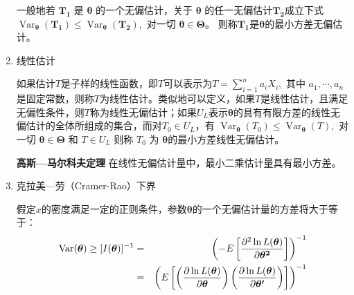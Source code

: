 \begin{enumerate}[1)]
		一般地若 $ \boldsymbol{T_1} $ 是 $ \boldsymbol{\theta} $ 的一个无偏估计，关于 $ \boldsymbol{\theta} $ 的任一无偏估计$ \boldsymbol{T_2} $成立下式
        $ \operatorname{Var}_{\boldsymbol{\theta}}\left(\boldsymbol{T_{1}}\right) \leqslant 
           \operatorname{Var}_{\boldsymbol{\theta}}\left(\boldsymbol{T_{2}}\right),$  对一切  $\boldsymbol{\theta \in \Theta }$。
		则称$\boldsymbol{ T_1 } $是$ \boldsymbol{\theta} $的最小方差无偏估计。
		
		\item 线性估计
		
		如果估计$ T $是子样的线性函数，即$ T $可以表示为$ T=\sum_{i=1}^{n} a_{i} X_{i},  $ 其中  $ a_{1}, \cdots, a_{n} $是固定常数，则称$ T $为线性估计。类似地可以定义，如果$ T $是线性估计，且满足无偏性条件，则$ T $称为线性无偏估计；如果$ U_L $表示$ \boldsymbol{\theta} $的具有有限方差的线性无偏估计的全体所组成的集合，而对$ T_0 \in U_L$，有
        $ \operatorname{Var}_{\boldsymbol{\theta}}\left(T_{0}\right) \leqslant \operatorname{Var}_{\boldsymbol{\theta}}(T),$  
        对一切  $ \boldsymbol{\theta \in \Theta}$ 和  $T \in U_{L} $ 
		则称 $ T_0 $ 为 $ \boldsymbol{\theta} $的最小方差线性无偏估计。
		
		{\bf 高斯—马尔科夫定理} 在线性无偏估计量中，最小二乘估计量具有最小方差。
		
		\item 克拉美—劳（Cramer-Rao）下界
		\begin{mydef}
			假定$ x $的密度满足一定的正则条件，参数$ \boldsymbol{\theta} $的一个无偏估计量的方差将大于等于：
		\begin{eqnarray}
            \operatorname{Var}(\boldsymbol{\theta}) \geq[I(\boldsymbol{\theta})]^{-1}  & = & \left(-E\left[\frac{\partial^{2} 
            \ln L(\boldsymbol{\theta} )}{\partial \boldsymbol{\theta^{2}} }\right]\right)^{-1} \notag \\
            & = & \left(E\left[\left(\frac{\partial \ln L(\boldsymbol{\theta})}{\partial \boldsymbol{\theta}}\right)
            \left(\frac{\partial \ln L(\boldsymbol{\theta})}{\partial \boldsymbol{\theta^{\prime}} }\right)\right]\right)^{-1} \notag
		\end{eqnarray}
		\end{mydef}


\end{enumerate}
